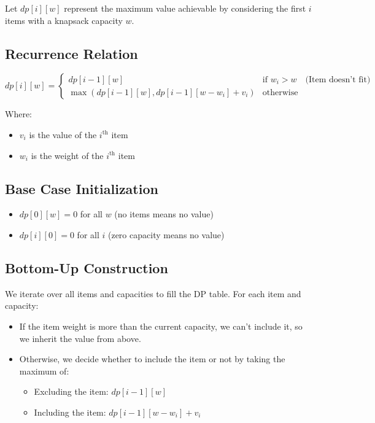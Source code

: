 \documentclass[14pt]{extarticle}
\begin{document}
Let $dp[i][w]$ represent the maximum value achievable by considering the first $i$ items with a knapsack capacity $w$.

\subsection*{Recurrence Relation}

\[
dp[i][w] =
\begin{cases}
    dp[i-1][w] & \text{if } w_i > w \quad \text{(Item doesn't fit)} \\
    \max(dp[i-1][w], dp[i-1][w - w_i] + v_i) & \text{otherwise}
\end{cases}
\]

Where:
\begin{itemize}
    \item $v_i$ is the value of the $i^\text{th}$ item
    \item $w_i$ is the weight of the $i^\text{th}$ item
\end{itemize}

\subsection*{Base Case Initialization}

\begin{itemize}
    \item $dp[0][w] = 0$ for all $w$ (no items means no value)
    \item $dp[i][0] = 0$ for all $i$ (zero capacity means no value)
\end{itemize}

\subsection*{Bottom-Up Construction}

We iterate over all items and capacities to fill the DP table. For each item and capacity:

\begin{itemize}
    \item If the item weight is more than the current capacity, we can't include it, so we inherit the value from above.
    \item Otherwise, we decide whether to include the item or not by taking the maximum of:
    \begin{itemize}
        \item Excluding the item: $dp[i-1][w]$
        \item Including the item: $dp[i-1][w - w_i] + v_i$
    \end{itemize}
\end{itemize}
\end{document}
